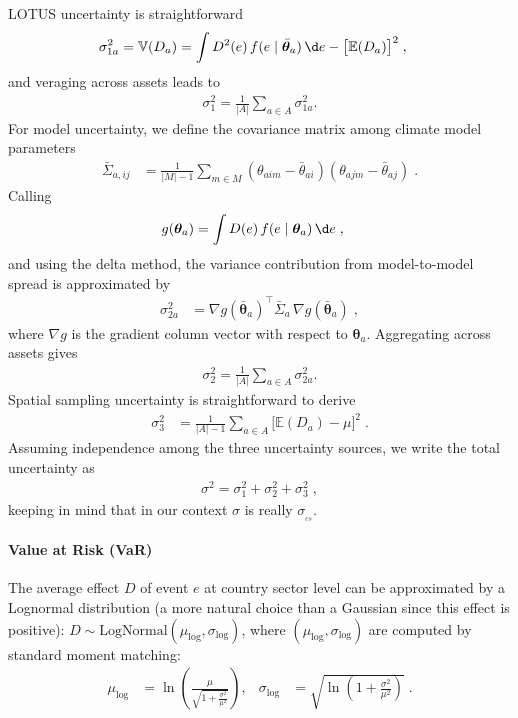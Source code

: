 LOTUS uncertainty is straightforward
\begin{align}
\sigma_{1a}^2  &= \mathbb{V}(D_a) = \int D^2(e)\, f(e \mid \bar{\bm{\theta}}_a)\,\d e 
%
 - \big[\mathbb{E}(D_a)\big]^2\;,  \label{eq:sigma1s}
\end{align}
and veraging across assets leads to
\begin{align}
\sigma_1^2 = \frac{1}{|A|}\sum_{a \in A} \sigma_{1a}^2.
\label{eq:sigma1}
\end{align}
For model uncertainty, we define the covariance matrix among climate model parameters
\begin{align}
\bar{\Sigma}_{a,ij} &= \frac{1}{|M|-1}\sum_{m \in M} (\theta_{aim}-\bar{\theta}_{ai})(\theta_{ajm}-\bar{\theta}_{aj})\;. \label{eq:cov_theta}
\end{align}
Calling
\begin{align}
g(\bm{\theta}_a)  &= \int D(e)\, f(e \mid \bm{\theta}_a)\, \d e\;,\label{eq:g}
\end{align}
and using the delta method, the variance contribution from model-to-model spread is approximated by
\begin{align}
\sigma_{2a}^2 &= \nabla g(\bar{\bm{\theta}}_a)^{\!\top} \bar{\Sigma}_a\, 
%
\nabla g(\bar{\bm{\theta}}_a)\;,\label{eq:sigma2s}
\end{align}
where $\nabla g$ is the gradient column vector with respect to $\bm{\theta}_a$. Aggregating across assets gives
\begin{align}
\sigma_2^2 = \frac{1}{|A|}\sum_{a \in A} \sigma_{2a}^2. \label{eq:sigma2}
\end{align}
Spatial sampling uncertainty is straightforward to derive
\begin{align}
\sigma_3^2  &= \frac{1}{|A|-1}\sum_{a \in A} \big[\mathbb{E}(D_a) - \mu\big]^2\;. \label{eq:sigma3}
\end{align}
Assuming independence among the three uncertainty sources, we write the total uncertainty as
\begin{align}
\sigma^2 = \sigma_1^2 + \sigma_2^2 + \sigma_3^2\;,\label{eq:sigma_total}
\end{align}
keeping in mind that in our context $\sigma$ is really $\sigma_{_{cs}}$.

\paragraph{Value at Risk (VaR)}

The average effect $D$ of event $e$ at country sector level can be approximated by a Lognormal distribution (a more natural choice than a Gaussian since this effect is positive): $D \sim \text{LogNormal}(\mu_{\text{log}}, \sigma_{\text{log}})$, where $(\mu_{\text{log}}, \sigma_{\text{log}})$ are computed by standard moment matching:
\begin{align}
\mu_{\text{log}} &=  \ln\!\left(\frac{\mu}{\sqrt{1+\frac{\sigma^2}{\mu^2}}}\right), &
%
\sigma_{\text{log}} &= \sqrt{\ln\!\left(1+\frac{\sigma^2}{\mu^2}\right)}\;. \label{eq:mu_sigma_log}
\end{align}

